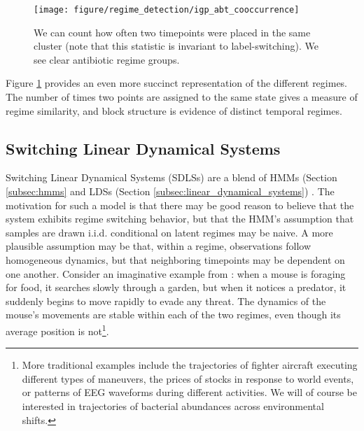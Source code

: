 \begin{figure}
  \centering
  \texttt{[image: figure/regime\_detection/igp\_abt\_cooccurrence]}
  \caption{We can count how often two timepoints were placed in the same cluster
    (note that this statistic is invariant to label-switching). We see clear
    antibiotic regime groups. \label{fig:igp_abt_cooccurrence}}
\end{figure}

Figure \ref{fig:igp_abt_cooccurrence} provides an even more succinct
representation of the different regimes. The number of times two points are
assigned to the same state gives a measure of regime similarity, and block
structure is evidence of distinct temporal regimes.

\subsection{Switching Linear Dynamical Systems}
\label{subsubsec:switching_dynamical}

Switching Linear Dynamical Systems (SDLSs) are a blend of HMMs (Section
\ref{subsec:hmms} and LDSs (Section \ref{subsec:linear_dynamical_systems})
\citep{ghahramani1998variational, fox2009sharing, linderman2016recurrent}. The
motivation for such a model is that there may be good reason to believe that the
system exhibits regime switching behavior, but that the HMM's assumption that
samples are drawn i.i.d. conditional on latent regimes may be naive. A more
plausible assumption may be that, within a regime, observations follow
homogeneous dynamics, but that neighboring timepoints may be dependent on one
another. Consider an imaginative example from \citep{linderman2016recurrent}:
when a mouse is foraging for food, it searches slowly through a garden, but when
it notices a predator, it suddenly begins to move rapidly to evade any threat.
The dynamics of the mouse's movements are stable within each of the two regimes,
even though its average position is not\footnote{More traditional examples
  include the trajectories of fighter aircraft executing different types of
  maneuvers, the prices of stocks in response to world events, or patterns of
  EEG waveforms during different activities. We will of course be interested in
  trajectories of bacterial abundances across environmental shifts.}.


